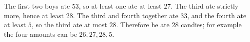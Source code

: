 The first two boys ate $53$, so at least one ate at least $27$. The third ate strictly more, hence at least $28$. The third and fourth together ate $33$, and the fourth ate at least $5$, so the third ate at most $28$. Therefore he ate $\boxed{28}$ candies; for example the four amounts can be $26,27,28,5$.
